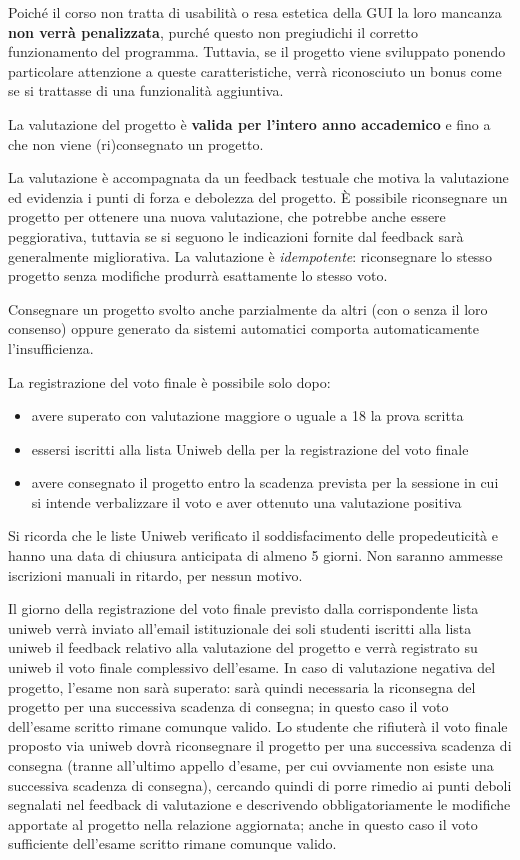 \documentclass[10pt,a4paper,oneside]{article}
\begin{document}
Poiché il corso non tratta di usabilità o resa estetica della GUI la loro mancanza \textbf{non verrà penalizzata}, purché questo non pregiudichi il corretto funzionamento del programma. Tuttavia, se il progetto viene sviluppato ponendo particolare attenzione a queste caratteristiche, verrà riconosciuto un bonus come se si trattasse di una funzionalità aggiuntiva.

La valutazione del progetto è \textbf{valida per l'intero anno accademico} e fino a che non viene (ri)consegnato un progetto.

La valutazione è accompagnata da un feedback testuale che motiva la valutazione ed evidenzia i punti di forza e debolezza del progetto. È possibile riconsegnare un progetto per ottenere una nuova valutazione, che potrebbe anche essere peggiorativa, tuttavia se si seguono le indicazioni fornite dal feedback sarà generalmente migliorativa. La valutazione è \emph{idempotente}: riconsegnare lo stesso progetto senza modifiche produrrà esattamente lo stesso voto.

Consegnare un progetto svolto anche parzialmente da altri (con o senza il loro consenso) oppure generato da sistemi automatici comporta automaticamente l'insufficienza.

La registrazione del voto finale è possibile solo dopo:
\begin{itemize}
 \item avere superato con valutazione maggiore o uguale a 18 la prova scritta
 \item essersi iscritti alla lista Uniweb della per la registrazione del voto finale
 \item avere consegnato il progetto entro la scadenza prevista per la sessione in cui si intende verbalizzare il voto e aver ottenuto una valutazione positiva
\end{itemize}
Si ricorda che le liste Uniweb verificato il soddisfacimento delle propedeuticità e hanno una data di chiusura anticipata di almeno 5 giorni. Non saranno ammesse iscrizioni manuali in ritardo, per nessun motivo.

Il giorno della registrazione del voto finale previsto dalla corrispondente lista uniweb verrà inviato all'email istituzionale dei soli studenti iscritti alla lista uniweb il feedback relativo alla valutazione del progetto e verrà registrato su uniweb il voto finale complessivo dell'esame. In caso di valutazione negativa del progetto, l'esame non sarà superato: sarà quindi necessaria la riconsegna del progetto per una successiva scadenza di consegna; in questo caso il voto dell'esame scritto rimane comunque valido. Lo studente che rifiuterà il voto finale proposto via uniweb dovrà riconsegnare il progetto per una successiva scadenza di consegna (tranne all'ultimo appello d'esame, per cui ovviamente non esiste una successiva scadenza di consegna), cercando quindi di porre rimedio ai punti deboli segnalati nel feedback di valutazione e descrivendo obbligatoriamente le modifiche apportate al progetto nella relazione aggiornata; anche in questo caso il voto sufficiente dell'esame scritto rimane comunque valido. 
\end{document}
